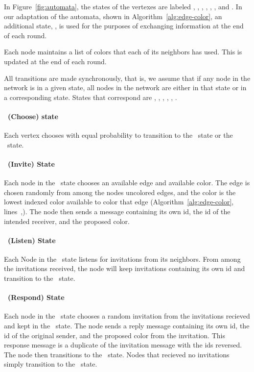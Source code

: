 \label{sec:dimaed-description}
In Figure~\ref{fig:automata}, the states of the vertexes are labeled \cCd, \cId, \cLd, \cWd, \cRd, \cUd, and \cDd. In our adaptation of the automata, shown in Algorithm~\ref{alg:edge-color}, an additional state, \cEd, is used for the purposes of exchanging information at the end of each round.

Each node maintains a list of colors that each of its neighbors has used. This is updated at the end of each round.

All transitions are made synchronously, that is, we assume that if any node in the network is in a given state, all nodes in the network are either in that state or in a corresponding state. States that correspond are {\cCd, \cDd}, {\cId, \cLd}, {\cRd, \cWd}.

\paragraph{\cCd\ (Choose) state}
Each vertex chooses with equal probability to transition to the \cId\ state or the \cLd\ state. 

\paragraph{\cId\ (Invite) State} 
Each node in the \cId\ state chooses an available edge and available color. The edge is chosen randomly from among the nodes uncolored edges, and the color is the lowest indexed color available to color that edge (Algorithm~\ref{alg:edge-color}, lines~,). The node then sends a message containing its own id, the id of the intended receiver, and the proposed color. 

\paragraph{\cLd\ (Listen) State} 
Each Node in the \cLd\ state listens for invitations from its neighbors. From among the invitations received, the node will keep invitations containing its own id and transition to the \cRd\ state.

\paragraph{\cRd\ (Respond) State}
Each node in the \cRd\ state chooses a random invitation from the invitations recieved and kept in the \cLd\ state. The node sends a reply message containing its own id, the id of the original sender, and the proposed color from the invitation. This response message is a duplicate of the invitation message with the ids reversed. The node then transitions to the \cUd\ state. Nodes that recieved no invitations simply transition to the \cUd\ state.

